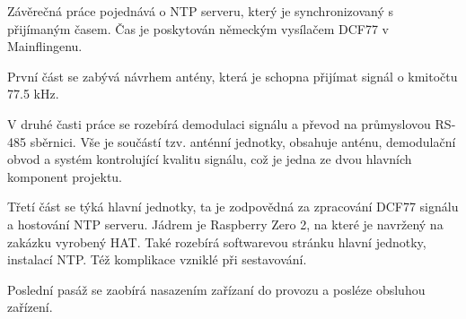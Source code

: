 Závěrečná práce pojednává o NTP serveru, který je synchronizovaný s přijímaným časem. Čas
je poskytován německým vysílačem DCF77 v Mainflingenu.

První část se zabývá návrhem antény, která je schopna přijímat signál o kmitočtu 77.5 kHz.

V druhé časti práce se rozebírá demodulaci signálu a převod na průmyslovou RS-485
sběrnici. Vše je součástí tzv. anténní jednotky, obsahuje anténu, demodulační obvod a systém kontrolující kvalitu
signálu, což je jedna ze dvou hlavních komponent projektu.

Třetí část se týká hlavní jednotky, ta je zodpovědná za zpracování DCF77 signálu a
hostování NTP serveru. Jádrem je Raspberry Zero 2, na které je navržený na zakázku
vyrobený HAT. Také rozebírá softwarevou stránku hlavní jednotky, instalací NTP. Též
komplikace vzniklé při sestavování.

Poslední pasáž se zaobírá nasazením zařízaní
do provozu a posléze obsluhou zařízení.
